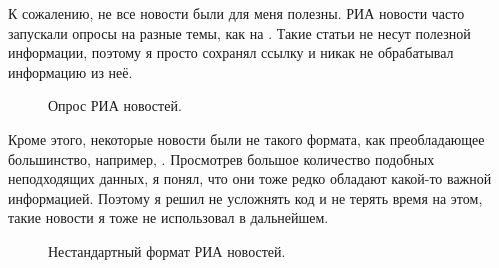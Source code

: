 \documentclass[12pt, a4paper]{article}
\begin{document}
К сожалению, не все новости были для меня полезны. РИА новости часто запускали опросы на разные темы, как на . Такие статьи не несут полезной информации, поэтому я просто сохранял ссылку и никак не обрабатывал информацию из неё.
\begin{figure}[H]
\caption{Опрос РИА новостей.}
\label{fig:opros}
\end{figure}

Кроме этого, некоторые новости были не такого формата, как преобладающее большинство, например, . Просмотрев большое количество подобных неподходящих данных, я понял, что они тоже редко обладают какой-то важной информацией. Поэтому я решил не усложнять код и не терять время на этом, такие новости я тоже не использовал в дальнейшем.
\begin{figure}[h!]
\caption{Нестандартный формат РИА новостей.}
\label{fig:unusial}
\end{figure}
\end{document}
